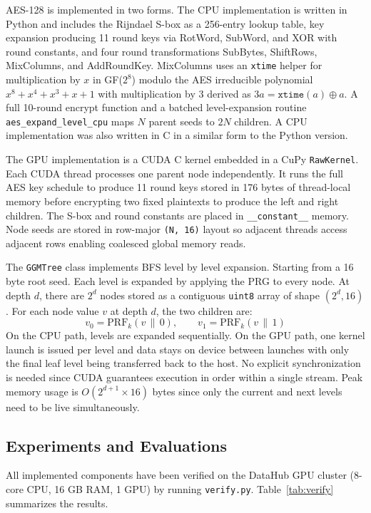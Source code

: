 \documentclass[12pt]{article}
\begin{document}
AES-128 is implemented in two forms. The CPU implementation is written in Python and includes the Rijndael S-box as a 256-entry lookup table, key expansion producing 11 round keys via RotWord, SubWord, and XOR with round constants, and four round transformations SubBytes, ShiftRows, MixColumns, and AddRoundKey. MixColumns uses an \texttt{xtime} helper for multiplication by $x$ in GF($2^8$) modulo the AES irreducible polynomial $x^8 + x^4 + x^3 + x + 1$ with multiplication by 3 derived as $3a = \texttt{xtime}(a) \oplus a$. A full 10-round encrypt function and a batched level-expansion routine \texttt{aes\_expand\_level\_cpu} maps $N$ parent seeds to $2N$ children. A CPU implementation was also written in C in a similar form to the Python version.

The GPU implementation is a CUDA C kernel embedded in a CuPy \texttt{RawKernel}. Each CUDA thread processes one parent node independently. It runs the full AES key schedule to produce 11 round keys stored in 176 bytes of thread-local memory before encrypting two fixed plaintexts to produce the left and right children. The S-box and round constants are placed in \texttt{\_\_constant\_\_} memory. Node seeds are stored in row-major \texttt{(N, 16)} layout so adjacent threads access adjacent rows enabling coalesced global memory reads.

The \texttt{GGMTree} class implements BFS level by level expansion. Starting from a 16 byte root seed. Each level is expanded by applying the PRG to every node. At depth $d$, there are $2^d$ nodes stored as a contiguous \texttt{uint8} array of shape $(2^d, 16)$. For each node value $v$ at depth $d$, the two children are:
\[
v_0 = \text{PRF}_k(v \,\|\, 0), \qquad v_1 = \text{PRF}_k(v \,\|\, 1)
\]
On the CPU path, levels are expanded sequentially. On the GPU path, one kernel launch is issued per level and data stays on device between launches with only the final leaf level being transferred back to the host. No explicit synchronization is needed since CUDA guarantees execution in order within a single stream. Peak memory usage is $O(2^{d+1} \times 16)$ bytes since only the current and next levels need to be live simultaneously.

\subsection{Experiments and Evaluations}

All implemented components have been verified on the DataHub GPU cluster (8-core CPU, 16 GB RAM, 1 GPU) by running \texttt{verify.py}. Table~\ref{tab:verify} summarizes the results.
\end{document}
